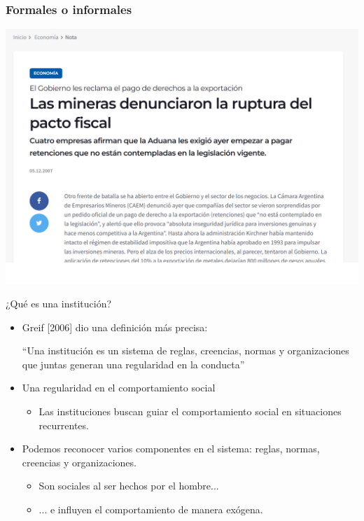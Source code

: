 \documentclass{beamer}
\begin{document}
\begin{frame}
\frametitle{Formales o informales}
\centering
\includegraphics[scale=0.4]{../Figures/Mina2.png}
\end{frame}


\begin{frame}{¿Qué es una institución?}
    \begin{itemize}
        \item Greif [2006] dio una definición más precisa:
        \begin{boxA}
            \centering
            ``Una institución es un sistema de reglas, creencias, normas y organizaciones que juntas generan una regularidad en la conducta''\vspace{2mm}
        \end{boxA}
        \item Una regularidad en el comportamiento social 
        \begin{itemize}
            \item Las instituciones buscan guiar el comportamiento social en situaciones recurrentes. \vspace{2mm}
        \end{itemize}
        \item Podemos reconocer varios componentes en el sistema: reglas, normas, creencias y organizaciones. 
        \begin{itemize}
            \item Son sociales al ser hechos por el hombre...
            \item ... e influyen el comportamiento de manera exógena.
        \end{itemize}
    \end{itemize}
\end{frame}
\end{document}
